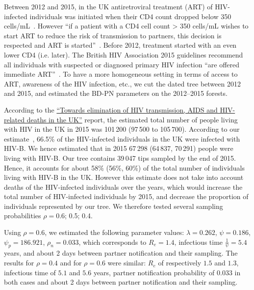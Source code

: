 \documentclass[a4paper,10pt]{article}
\begin{document}
Between 2012 and 2015, in the UK antiretroviral treatment (ART) of HIV-infected individuals  was initiated when their CD4 count dropped below 350 cells/mL~\citep{williamsBritishHIVAssociation2012}. However ``if a patient with a CD4 cell count > 350 cells/mL wishes to start ART to reduce the risk of transmission to partners, this decision is respected and ART is started''~\citep{williamsBritishHIVAssociation2012}. Before 2012, treatment started with an even lower CD4 (i.e. later). The British HIV Association 2015 guidelines recommend all individuals with suspected or diagnosed primary HIV infection ``are offered immediate ART''~\citep{churchillBritishHIVAssociation2016}. To have a more homogeneous setting in terms of access to ART, awareness of the HIV infection, etc., we cut the dated tree between 2012 and 2015, and estimated the BD-PN parameters on the 2012--2015 forests. 

According to the \href{https://webarchive.nationalarchives.gov.uk/ukgwa/20181112132123mp_/https://assets.publishing.service.gov.uk/government/uploads/system/uploads/attachment_data/file/602942/HIV_in_the_UK_report.pdf}{``Towards elimination of HIV transmission, AIDS and HIV-related deaths in the UK''}
 report, the estimated total number of people living with HIV in the UK in 2015 was 101\,200 (97\,500 to 105\,700). %
According to our estimate~\citep{zhukovaModelingDrugResistance2023}, 66.5\% of the HIV-infected individuals in the UK were infected with HIV-B. We hence estimated that in 2015 67\,298 (64\,837, 70\,291) people were living with HIV-B. Our tree contains 39\,047 tips sampled by the end of 2015. Hence, it accounts for about 58\% (56\%, 60\%) of the total number of individuals living with HIV-B in the UK. However this estimate does not take into account deaths of the HIV-infected individuals over the years, which would increase the total number of HIV-infected individuals by 2015, and decrease the proportion of individuals represented by our tree. We therefore tested several sampling probabilities $\rho=$0.6; 0.5; 0.4.
 
 
Using $\rho=0.6$, we estimated the following parameter values: $\lambda=0.262$, $\psi=0.186$, $\psi_p=186.921$, $\rho_n=0.033$, which corresponds to $R_e = 1.4$, infectious time $\frac{1}{\psi} = 5.4$ years, and about 2 days between partner notification and their sampling. The results for $\rho=0.4$ and for $\rho=0.6$ were similar: $R_e$ of respectively $1.5$ and 
$1.3$, infectious time of $5.1$ and $5.6$ years, partner notification probability of $0.033$ in both cases and about 2 days between partner notification and their sampling.
 
\end{document}
